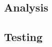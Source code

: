 \documentclass[12pt,a4paper]{article}
\begin{document}
		\subsection{Analysis}
		\subsection{Testing}
\end{document}
